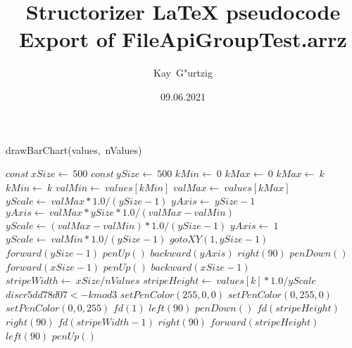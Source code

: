 \documentclass[a4paper,10pt]{article}
\title{Structorizer LaTeX pseudocode Export of FileApiGroupTest.arrz}
\author{Kay\ G"urtzig}
\date{09.06.2021}
\begin{document}
\begin{algorithm}
\caption{drawBarChart(values,\ nValues)}
\begin{algorithmic}[5]

\STATE {}
\STATE {}
\STATE {}
\STATE {}
  \STATE \(const\ xSize\gets\ 500\)
  \STATE \(const\ ySize\gets\ 500\)
  \STATE \(kMin\gets\ 0\)
  \STATE \(kMax\gets\ 0\)
      \STATE \(kMax\gets\ k\)
    \ELSE
        \STATE \(kMin\gets\ k\)
      \ENDIF
    \ENDIF
  \ENDFOR
  \STATE \(valMin\gets\ values[kMin]\)
  \STATE \(valMax\gets\ values[kMax]\)
  \STATE \(yScale\gets\ valMax*1.0/(ySize-1)\)
  \STATE \(yAxis\gets\ ySize-1\)
      \STATE \(yAxis\gets\ valMax*ySize*1.0/(valMax-valMin)\)
      \STATE \(yScale\gets(valMax-valMin)*1.0/(ySize-1)\)
    \ELSE
      \STATE \(yAxis\gets\ 1\)
      \STATE \(yScale\gets\ valMin*1.0/(ySize-1)\)
    \ENDIF
  \ENDIF
  \STATE \(gotoXY(1,ySize-1)\)
  \STATE \(forward(ySize-1)\)
  \STATE \(penUp()\)
  \STATE \(backward(yAxis)\)
  \STATE \(right(90)\)
  \STATE \(penDown()\)
  \STATE \(forward(xSize-1)\)
  \STATE \(penUp()\)
  \STATE \(backward(xSize-1)\)
  \STATE \(stripeWidth\gets\ xSize/nValues\)
    \STATE \(stripeHeight\gets\ values[k]*1.0/yScale\)
    \STATE \(discr5dd78d07 <- k mod 3\)
      \STATE \(setPenColor(255,0,0)\)
      \STATE \(setPenColor(0,255,0)\)
      \STATE \(setPenColor(0,0,255)\)
    \ENDIF
    \STATE \(fd(1)\)
    \STATE \(left(90)\)
    \STATE \(penDown()\)
    \STATE \(fd(stripeHeight)\)
    \STATE \(right(90)\)
    \STATE \(fd(stripeWidth-1)\)
    \STATE \(right(90)\)
    \STATE \(forward(stripeHeight)\)
    \STATE \(left(90)\)
    \STATE \(penUp()\)
  \ENDFOR

\end{algorithmic}
\end{algorithm}
\end{document}
